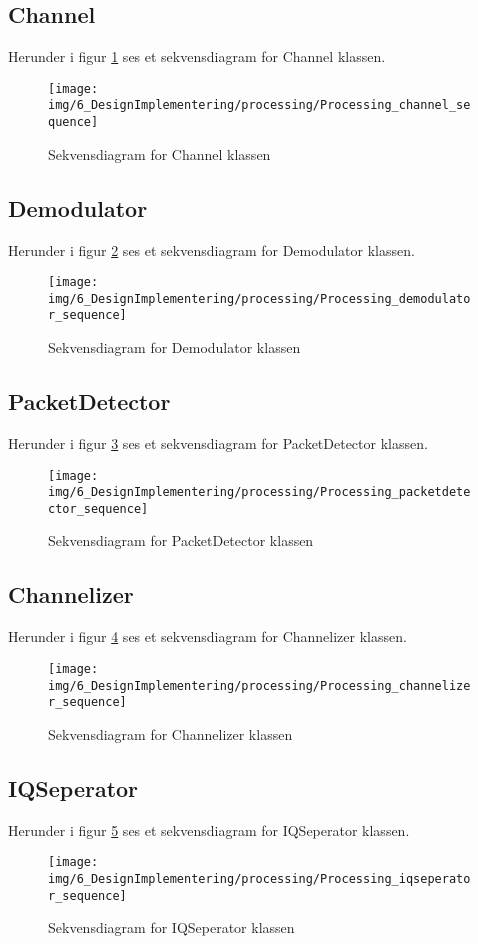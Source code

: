 \begin{appendices}
\pagebreak

\subsection{Channel}
Herunder i figur \ref{fig:Channel_sequence} ses et sekvensdiagram for Channel klassen.
\begin{figure}[H]
	\centering
	\texttt{[image: img/6\_DesignImplementering/processing/Processing\_channel\_sequence]}
	\caption{Sekvensdiagram for Channel klassen}
	\label{fig:Channel_sequence}
\end{figure}

\pagebreak
\subsection{Demodulator}
Herunder i figur \ref{fig:Demodulator_sequence} ses et sekvensdiagram for Demodulator klassen.
\begin{figure}[H]
	\centering
	\texttt{[image: img/6\_DesignImplementering/processing/Processing\_demodulator\_sequence]}
	\caption{Sekvensdiagram for Demodulator klassen}
	\label{fig:Demodulator_sequence}
\end{figure}

\pagebreak
\subsection{PacketDetector}
Herunder i figur \ref{fig:PacketDetector_sequence} ses et sekvensdiagram for PacketDetector klassen.
\begin{figure}[H]
	\centering
	\texttt{[image: img/6\_DesignImplementering/processing/Processing\_packetdetector\_sequence]}
	\caption{Sekvensdiagram for PacketDetector klassen}
	\label{fig:PacketDetector_sequence}
\end{figure}

\pagebreak
\subsection{Channelizer}
Herunder i figur \ref{fig:Channelizer_sequence} ses et sekvensdiagram for Channelizer klassen.
\begin{figure}[H]
	\centering
	\texttt{[image: img/6\_DesignImplementering/processing/Processing\_channelizer\_sequence]}
	\caption{Sekvensdiagram for Channelizer klassen}
	\label{fig:Channelizer_sequence}
\end{figure}
\pagebreak
\subsection{IQSeperator}
Herunder i figur \ref{fig:IQSeperator_sequence} ses et sekvensdiagram for IQSeperator klassen.
\begin{figure}[H]
	\centering
	\texttt{[image: img/6\_DesignImplementering/processing/Processing\_iqseperator\_sequence]}
	\caption{Sekvensdiagram for IQSeperator klassen}
	\label{fig:IQSeperator_sequence}
\end{figure}
\pagebreak

\end{appendices}
